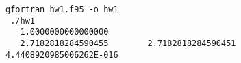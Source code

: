 \begin{Verbatim}[frame=lines,label=hw1 - commands and output]
 gfortran hw1.f95 -o hw1
 ./hw1
   1.0000000000000000     
   2.7182818284590455        2.7182818284590451        4.4408920985006262E-016
\end{Verbatim}

